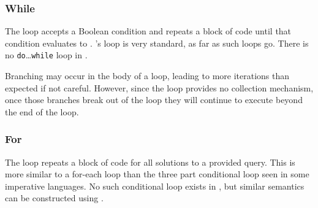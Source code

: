 \subsubsection{While}

The  loop accepts a Boolean condition and repeats a block of code
until that condition evaluates to . \Trilogy{}'s  loop is
very standard, as far as such loops go. There is no \texttt{do}\dots\texttt{while}
loop in \Trilogy{}.

\begin{bnf*}
\end{bnf*}

Branching may occur in the body of a  loop, leading to more iterations
than expected if not careful. However, since the  loop provides no collection
mechanism, once those branches break out of the loop they will continue to execute
beyond the end of the loop.

\begin{prooftree}
\end{prooftree}

\begin{prooftree}
\end{prooftree}

\subsubsection{For}

The  loop repeats a block of code for all solutions to a provided query.
This is more similar to a for-each loop than the three part conditional loop seen in
some imperative languages. No such conditional  loop exists in \Trilogy{},
but similar semantics can be constructed using .

\begin{bnf*}
     \\
     \\
\end{bnf*}

